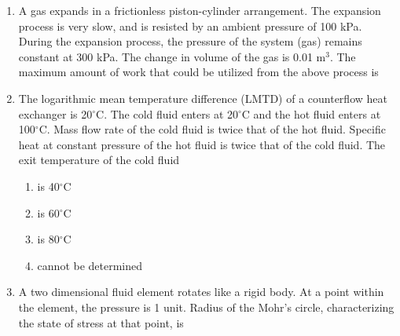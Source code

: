 \documentclass[journal,12pt,onecolumn]{IEEEtran}
\begin{document}
\begin{enumerate}[resume]
    \item A gas expands in a frictionless piston-cylinder arrangement. The expansion process is very slow, and is resisted by an ambient pressure of 100 kPa. During the expansion process, the pressure of the system (gas) remains constant at 300 kPa. The change in volume of the gas is 0.01 m$^3$. The maximum amount of work that could be utilized from the above process is
          \begin{enumerate}
          \end{enumerate}

    \item The logarithmic mean temperature difference (LMTD) of a counterflow heat exchanger is 20$^\circ$C. The cold fluid enters at 20$^\circ$C and the hot fluid enters at 100$^\circ$C. Mass flow rate of the cold fluid is twice that of the hot fluid. Specific heat at constant pressure of the hot fluid is twice that of the cold fluid. The exit temperature of the cold fluid
          \begin{enumerate}
              \item is 40$^\circ$C
              \item is 60$^\circ$C
              \item is 80$^\circ$C
              \item cannot be determined
          \end{enumerate}

    \item A two dimensional fluid element rotates like a rigid body. At a point within the element, the pressure is 1 unit. Radius of the Mohr's circle, characterizing the state of stress at that point, is
          \begin{enumerate}
          \end{enumerate}


\end{enumerate}
\end{document}
